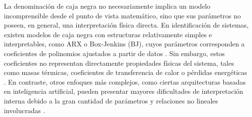 \documentclass[11pt]{report}
\begin{document}
La denominación de caja negra no necesariamente implica un modelo incomprensible desde el punto de vista matemático, sino que sus parámetros no poseen, en general, una interpretación física directa. En identificación de sistemas, existen modelos de caja negra con estructuras relativamente simples e interpretables, como ARX o Box-Jenkins (BJ), cuyos parámetros corresponden a coeficientes de polinomios ajustados a partir de datos . Sin embargo, estos coeficientes no representan directamente propiedades físicas del sistema, tales como masas térmicas, coeficientes de transferencia de calor o pérdidas energéticas \cite{wallentinsson2020empirical}. En contraste, otros enfoques más complejos, como ciertas arquitecturas basadas en inteligencia artificial, pueden presentar mayores dificultades de interpretación interna debido a la gran cantidad de parámetros y relaciones no lineales involucradas \cite{hassija2024interpreting}.

\end{document}
